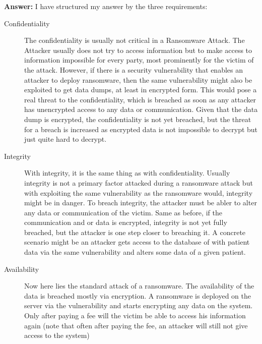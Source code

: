 \documentclass[11pt,a4paper]{article}
\begin{document}
    \newpage
    \textbf{Answer:}
    I have structured my answer by the three requirements:
    \begin{description}
        \item[Confidentiality] The confidentiality is usually not critical in a Ransomware Attack.
        The Attacker usually does not try to access information but to make access to information impossible for every party, most prominently for the victim of the attack.
        However, if there is a security vulnerability that enables an attacker to deploy ransomware, then the same vulnerability might also be exploited to get data dumps, at least in encrypted form.
        This would pose a real threat to the confidentiality, which is breached as soon as any attacker has unencrypted access to any data or communication.
        Given that the data dump is encrypted, the confidentiality is not yet breached, but the threat for a breach is increased as encrypted data is not impossible to decrypt but just quite hard to decrypt.
        \item[Integrity] With integrity, it is the same thing as with confidentiality.
        Usually integrity is not a primary factor attacked during a ransomware attack but with exploiting the same vulnerability as the ransomware would, integrity might be in danger.
        To breach integrity, the attacker must be abler to alter any data or communication of the victim.
        Same as before, if the communication and or data is encrypted, integrity is not yet fully breached, but the attacker is one step closer to breaching it.
        A concrete scenario might be an attacker gets access to the database of with patient data via the same vulnerability and alters some data of a given patient.
        \item[Availability] Now here lies the standard attack of a ransomware.
        The availability of the data is breached mostly via encryption.
        A ransomware is deployed on the server via the vulnerability and starts encrypting any data on the system.
        Only after paying a fee will the victim be able to access his information again (note that often after paying the fee, an attacker will still not give access to the system)

    \end{description}
\end{document}
